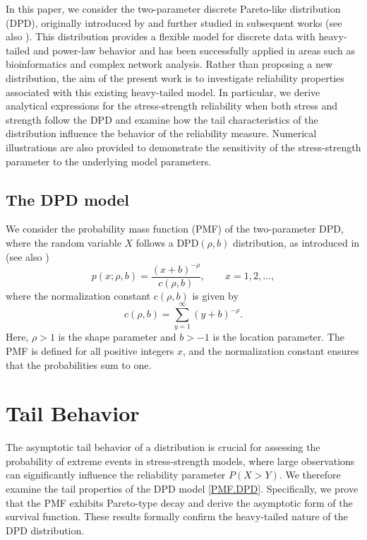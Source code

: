 \documentclass[twoside]{article}
\begin{document}
In this paper, we consider the two-parameter discrete Pareto-like distribution (DPD), originally introduced by \cite{Kuznetsov:2001} and further studied in subsequent works (see also \cite{Astola:2007, Kuznetsov:2017}). This distribution provides a flexible model for discrete data with heavy-tailed and power-law behavior and has been successfully applied in areas such as bioinformatics and complex network analysis. Rather than proposing a new distribution, the aim of the present work is to investigate reliability properties associated with this existing heavy-tailed model. In particular, we derive analytical expressions for the stress-strength reliability when both stress and strength follow the DPD and examine how the tail characteristics of the distribution influence the behavior of the reliability measure. Numerical illustrations are also provided to demonstrate the sensitivity of the stress-strength parameter to the underlying model parameters.


 

 


\subsection{The DPD model} 
We consider the  probability mass function (PMF)  of the two-parameter DPD, where the random variable $X$ follows a $\text{DPD}(\rho, b)$ distribution, as introduced in \cite{Kuznetsov:2001} (see also  \cite{Astola:2007, Kuznetsov:2017}) 
\begin{equation}\label{PMF.DPD} 
p(x;\rho,b) = \frac{(x+b)^{-\rho}}{c(\rho,b)}, \qquad x = 1, 2, \ldots, 
\end{equation} 
where the normalization constant $c(\rho,b)$ is given by 
\begin{equation}\label{normalization} 
c(\rho,b) = \sum_{y=1}^{\infty}(y+b)^{-\rho}. 
\end{equation} 
Here, $\rho > 1$ is the shape parameter and $b > -1$ is the location parameter. The PMF is defined for all positive integers $x$, and the normalization constant ensures that the probabilities sum to one.

\section{Tail Behavior}
The asymptotic tail behavior of a distribution is crucial for assessing the probability of extreme events in stress-strength models, where large observations can significantly influence the reliability parameter $P(X>Y)$.  We therefore examine the tail properties of the DPD model \eqref{PMF.DPD}. Specifically, we prove that the PMF exhibits Pareto-type decay and derive the asymptotic form of the survival function. These results formally confirm the heavy-tailed nature of the DPD distribution.
 
\end{document}
